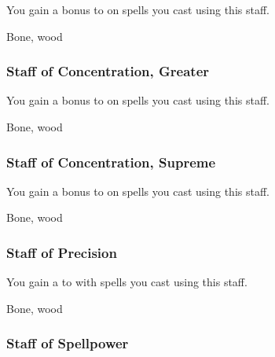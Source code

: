 You gain a  bonus to  on spells you cast using this staff.



 Bone, wood


\lowercase{\hypertarget{item:Staff of Concentration, Greater}{}}\label{item:Staff of Concentration, Greater}
\hypertarget{item:Staff of Concentration, Greater}{\subsubsection{Staff of Concentration, Greater\hfill{}}}

You gain a  bonus to  on spells you cast using this staff.



 Bone, wood


\lowercase{\hypertarget{item:Staff of Concentration, Supreme}{}}\label{item:Staff of Concentration, Supreme}
\hypertarget{item:Staff of Concentration, Supreme}{\subsubsection{Staff of Concentration, Supreme\hfill{}}}

You gain a  bonus to  on spells you cast using this staff.



 Bone, wood


\lowercase{\hypertarget{item:Staff of Precision}{}}\label{item:Staff of Precision}
\hypertarget{item:Staff of Precision}{\subsubsection{Staff of Precision\hfill{}}}

You gain a   to  with spells you cast using this staff.



 


 Bone, wood


\lowercase{\hypertarget{item:Staff of Spellpower}{}}\label{item:Staff of Spellpower}
\hypertarget{item:Staff of Spellpower}{\subsubsection{Staff of Spellpower\hfill{}}}

